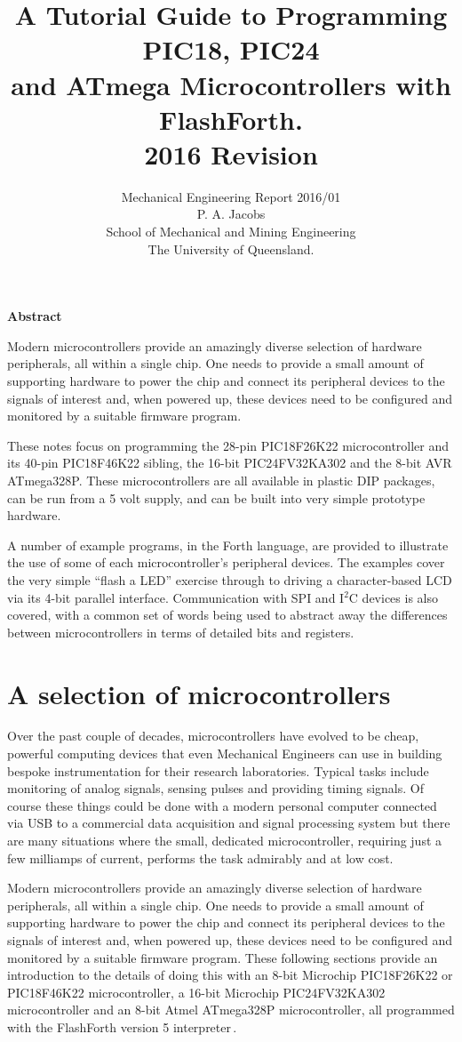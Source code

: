 \documentclass[12pt,a4paper]{article}
\title{
    A Tutorial Guide to Programming PIC18, PIC24 \\
    and ATmega Microcontrollers with FlashForth. \\
    2016 Revision
}
\author{
    Mechanical Engineering Report 2016/01\\
    P. A. Jacobs\\
    School of Mechanical and Mining Engineering\\
    The University of Queensland.
}
\begin{document}
\maketitle

\centerline{\textbf{Abstract}}
\medskip\noindent
Modern microcontrollers provide an amazingly diverse selection of hardware
peripherals, all within a single chip.
One needs to provide a small amount of supporting hardware to power the chip
and connect its peripheral devices to the signals of interest and, when powered up,
these devices need to be configured and monitored by a suitable firmware program.

\medskip\noindent
These notes focus on programming the 28-pin PIC18F26K22 microcontroller and
its 40-pin PIC18F46K22 sibling, 
the 16-bit PIC24FV32KA302 and 
the 8-bit AVR ATmega328P.
These microcontrollers are all available in plastic DIP packages, 
can be run from a 5 volt supply,
and can be built into very simple prototype hardware.

\medskip\noindent
A number of example programs, in the Forth language, are provided 
to illustrate the use of some of each microcontroller's peripheral devices.
The examples cover the very simple ``flash a LED'' exercise through to driving
a character-based LCD via its 4-bit parallel interface.
Communication with SPI and I$^2$C devices is also covered, with a common set of words
being used to abstract away the differences between microcontrollers 
in terms of detailed bits and registers.


\newpage
\tableofcontents

\newpage
\section{A selection of microcontrollers}
%
Over the past couple of decades, microcontrollers have evolved to be
cheap, powerful computing devices that even Mechanical Engineers can 
use in building bespoke instrumentation for their research laboratories.
Typical tasks include monitoring of analog signals, sensing pulses and 
providing timing signals.
Of course these things could be done with a modern personal computer
connected via USB to a commercial data acquisition and signal processing system
but there are many situations where the small, dedicated microcontroller,
requiring just a few milliamps of current, performs the task admirably 
and at low cost.

\medskip\noindent
Modern microcontrollers provide an amazingly diverse selection of hardware
peripherals, all within a single chip.
One needs to provide a small amount of supporting hardware to power the chip
and connect its peripheral devices to the signals of interest and, when powered up,
these devices need to be configured and monitored by a suitable firmware program.
These following sections provide an introduction to the details of doing this 
with an 8-bit Microchip PIC18F26K22 or PIC18F46K22 microcontroller, 
a 16-bit Microchip PIC24FV32KA302 microcontroller
and an 8-bit Atmel ATmega328P microcontroller, 
all programmed with the FlashForth version 5 interpreter\,\cite{nordman_2014a}.
\end{document}
